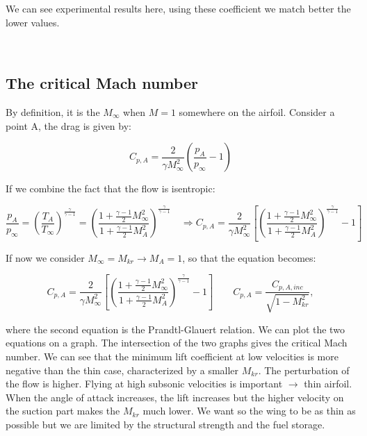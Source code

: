 	\begin{center}
	\end{center}	
	
	We can see experimental results here, using these coefficient we match better the lower values. 
	
	\ \\
	
\subsection{The critical Mach number}
	By definition, it is the $M_\infty$ when $M = 1$ somewhere on the airfoil. Consider a point A, the drag is given by: 
	
	\begin{equation}
	C_{p,A} = \frac{2}{\gamma M_\infty^2} \left( \frac{p_A}{p_\infty} -1 \right)
	\end{equation}
	
	If we combine the fact that the flow is isentropic:
	
	\begin{equation}
	\frac{p_A}{p_\infty} = \left(\frac{T_A}{T_\infty}\right)^{\frac{\gamma}{\gamma -1}} = \left(\frac{1+\frac{\gamma - 1}{2}M^2_\infty}{1+\frac{\gamma - 1}{2}M^2_A}\right)^{\frac{\gamma}{\gamma -1}} 
	\quad \Rightarrow C_{p,A} = \frac{2}{\gamma M_\infty^2} \left[ \left(\frac{1+\frac{\gamma - 1}{2}M^2_\infty}{1+\frac{\gamma - 1}{2}M^2_A}\right)^{\frac{\gamma}{\gamma -1}} -1 \right]
	\end{equation}
	
	If now we consider $M_\infty = M_{kr} \rightarrow M_A = 1$, so that the equation becomes: 
	
	\begin{equation}
	C_{p,A} = \frac{2}{\gamma M_\infty^2} \left[ \left(\frac{1+\frac{\gamma - 1}{2}M^2_\infty}{1+\frac{\gamma - 1}{2}M^2_A}\right)^{\frac{\gamma}{\gamma -1}} -1 \right] \qquad C_{p,A} = \frac{C_{p,A,inc}}{\sqrt{1-M_{kr}^2}},
	\end{equation}
	


	where the second equation is the Prandtl-Glauert relation. 
	We can plot the two equations on a graph. The intersection of the two graphs gives the critical Mach number. We can see that the minimum lift coefficient at low velocities is more negative than the thin case, characterized by a smaller $M_{kr}$. The perturbation of the flow is higher. Flying at high subsonic velocities is important $\rightarrow$ thin airfoil. When the angle of attack increases, the lift increases but the higher velocity on the suction part makes the $M_{kr}$ much lower. We want so the wing to be as thin as possible but we are limited by the structural strength and the fuel storage.
	
